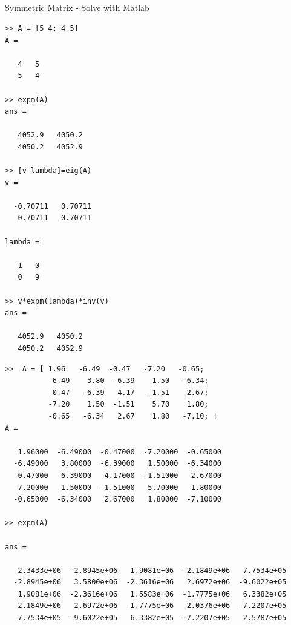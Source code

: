 \documentclass[xcolor=x11names,compress]{beamer}
\renewcommand{\(}{\begin{columns}}
\renewcommand{\)}{\end{columns}}
\newcommand{\<}[1]{\begin{column}{#1}}
\renewcommand{\>}{\end{column}}
\begin{document}
\subsection{}
\begin{frame}[fragile]{Symmetric Matrix - Solve with Matlab}
\begin{minipage}{.3\textwidth} 
\pause
\begin{tiny}
\begin{verbatim}
>> A = [5 4; 4 5]
A =

   4   5
   5   4
   
>> expm(A)
ans =

   4052.9   4050.2
   4050.2   4052.9 

>> [v lambda]=eig(A)
v =

  -0.70711   0.70711
   0.70711   0.70711

lambda =

   1   0
   0   9

>> v*expm(lambda)*inv(v)
ans =

   4052.9   4050.2
   4050.2   4052.9
\end{verbatim}
\end{tiny} 
\end{minipage}
\begin{minipage}{.65\textwidth} %
\pause
\begin{tiny}
\begin{verbatim}
>>  A = [ 1.96   -6.49  -0.47   -7.20   -0.65;
          -6.49    3.80  -6.39    1.50   -6.34;
          -0.47   -6.39   4.17   -1.51    2.67;
          -7.20    1.50  -1.51    5.70    1.80;
          -0.65   -6.34   2.67    1.80   -7.10; ]
A =

   1.96000  -6.49000  -0.47000  -7.20000  -0.65000
  -6.49000   3.80000  -6.39000   1.50000  -6.34000
  -0.47000  -6.39000   4.17000  -1.51000   2.67000
  -7.20000   1.50000  -1.51000   5.70000   1.80000
  -0.65000  -6.34000   2.67000   1.80000  -7.10000
  
>> expm(A)

ans =

   2.3433e+06  -2.8945e+06   1.9081e+06  -2.1849e+06   7.7534e+05
  -2.8945e+06   3.5800e+06  -2.3616e+06   2.6972e+06  -9.6022e+05
   1.9081e+06  -2.3616e+06   1.5583e+06  -1.7775e+06   6.3382e+05
  -2.1849e+06   2.6972e+06  -1.7775e+06   2.0376e+06  -7.2207e+05
   7.7534e+05  -9.6022e+05   6.3382e+05  -7.2207e+05   2.5787e+05
\end{verbatim}
\end{tiny}
\end{minipage}
\end{frame}
\end{document}
